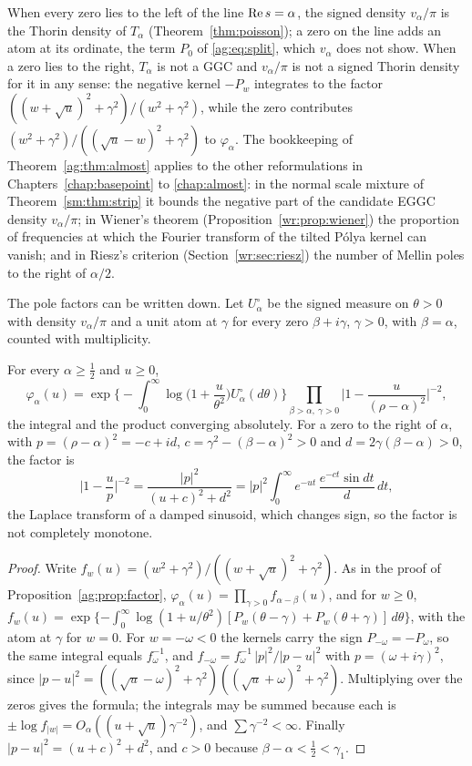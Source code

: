 When every zero lies to the left of the line $\operatorname{Re} s=\alpha$, the signed density $v_\alpha/\pi$ is the Thorin density of $T_\alpha$ (Theorem~\ref{thm:poisson}); a zero on the line adds an atom at its ordinate, the term $P_0$ of \eqref{ag:eq:split}, which $v_\alpha$ does not show. When a zero lies to the right, $T_\alpha$ is not a GGC and $v_\alpha/\pi$ is not a signed Thorin density for it in any sense: the negative kernel $-P_w$ integrates to the factor $((w+\sqrt u)^2+\gamma^2)/(w^2+\gamma^2)$, while the zero contributes $(w^2+\gamma^2)/((\sqrt u-w)^2+\gamma^2)$ to $\varphi_\alpha$. The bookkeeping of Theorem~\ref{ag:thm:almost} applies to the other reformulations in Chapters~\ref{chap:basepoint} to \ref{chap:almost}: in the normal scale mixture of Theorem~\ref{sm:thm:strip} it bounds the negative part of the candidate EGGC density $v_\alpha/\pi$; in Wiener's theorem (Proposition~\ref{wr:prop:wiener}) the proportion of frequencies at which the Fourier transform of the tilted P\'olya kernel can vanish; and in Riesz's criterion (Section~\ref{wr:sec:riesz}) the number of Mellin poles to the right of $\alpha/2$.

The pole factors can be written down. Let $U_\alpha^\circ$ be the signed measure on $\theta>0$ with density $v_\alpha/\pi$ and a unit atom at $\gamma$ for every zero $\beta+i\gamma$, $\gamma>0$, with $\beta=\alpha$, counted with multiplicity.

\begin{theorem}\label{tx:thm:signed}
For every $\alpha\ge\frac12$ and $u\ge0$,
\[
\varphi_\alpha(u)=\exp\Big\{-\int_0^\infty\log\Big(1+\frac u{\theta^2}\Big)U_\alpha^\circ(d\theta)\Big\}\prod_{\beta>\alpha,\ \gamma>0}\Big|1-\frac u{(\rho-\alpha)^2}\Big|^{-2},
\]
the integral and the product converging absolutely. For a zero to the right of $\alpha$, with $p=(\rho-\alpha)^2=-c+id$, $c=\gamma^2-(\beta-\alpha)^2>0$ and $d=2\gamma(\beta-\alpha)>0$, the factor is
\[
\Big|1-\frac up\Big|^{-2}=\frac{|p|^2}{(u+c)^2+d^2}=|p|^2\int_0^\infty e^{-ut}\,\frac{e^{-ct}\sin dt}d\,dt,
\]
the Laplace transform of a damped sinusoid, which changes sign, so the factor is not completely monotone.
\end{theorem}

\begin{proof}
Write $f_w(u)=(w^2+\gamma^2)/((w+\sqrt u)^2+\gamma^2)$. As in the proof of Proposition~\ref{ag:prop:factor}, $\varphi_\alpha(u)=\prod_{\gamma>0}f_{\alpha-\beta}(u)$, and for $w\ge0$, $f_w(u)=\exp\{-\int_0^\infty\log(1+u/\theta^2)[P_w(\theta-\gamma)+P_w(\theta+\gamma)]\,d\theta\}$, with the atom at $\gamma$ for $w=0$. For $w=-\omega<0$ the kernels carry the sign $P_{-\omega}=-P_\omega$, so the same integral equals $f_\omega^{-1}$, and $f_{-\omega}=f_\omega^{-1}\,|p|^2/|p-u|^2$ with $p=(\omega+i\gamma)^2$, since $|p-u|^2=((\sqrt u-\omega)^2+\gamma^2)((\sqrt u+\omega)^2+\gamma^2)$. Multiplying over the zeros gives the formula; the integrals may be summed because each is $\pm\log f_{|w|}=O_\alpha((u+\sqrt u)\gamma^{-2})$, and $\sum\gamma^{-2}<\infty$. Finally $|p-u|^2=(u+c)^2+d^2$, and $c>0$ because $\beta-\alpha<\frac12<\gamma_1$.
\end{proof}


